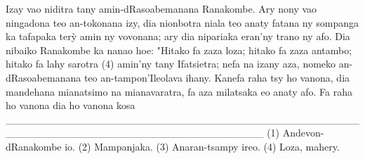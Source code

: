 Izay vao niditra tany amin-dRasoabemanana Ranakombe. Ary nony
vao ningadona teo an-tokonana izy, dia nionbotra niala teo anaty fatana
ny sompanga ka tafapaka terỳ amin ny vovonana; ary dia nipariaka eran'ny trano ny afo.
Dia nibaiko Ranakombe ka nanao hoe: "Hitako fa zaza loza; hitako fa zaza antambo; 
hitako fa lahy sarotra (4) amin'ny tany Ifatsietra; nefa na izany aza, 
nomeko an-dRasoabemanana teo an-tampon'Ileolava ihany. Kanefa raha tsy ho vanona, 
dia mandehana mianatsimo na mianavaratra, fa aza milatsaka eo anaty afo. 
Fa raha ho vanona dia ho vanona kosa
___________________________________________________________________________________
(1) Andevon-dRanakombe io. 
(2) Mampanjaka. 
(3) Anaran-tsampy ireo. 
(4) Loza, mahery.
